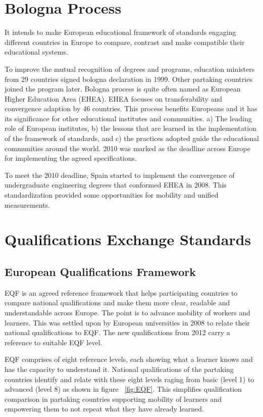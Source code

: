 \documentclass[12pt,a4paper,oneside]{book} %
\begin{document}
\section{Bologna Process}

It intends to make European educational framework of standards engaging different countries in Europe to compare, contrast and make compatible their educational systems. \cite{bologna process}

To improve the mutual recognition of degrees and programs, education ministers from 29 countries signed bologna declaration in 1999. Other partaking countries joined the program later. \cite{improvement bologna process} Bologna process is quite often named as European Higher Education Area (EHEA). EHEA focuses on transferability and convergence adaption by 46 countries. This process benefits Europeans and it has its significance for other educational institutes and communities. a) The leading role of European institutes, b) the lessons that are learned in the implementation of the framework of standards, and c) the practices adopted guide the educational communities around the world. 2010 was marked as the deadline across Europe for implementing the agreed specifications. \cite{European Higher Education Area }

To meet the 2010 deadline, Spain started to implement the convergence of undergraduate engineering degrees that conformed EHEA in 2008. This standardization provided some opportunities for mobility and unified measurements. \cite{European Higher Education Area }




\section{Qualifications Exchange Standards}

    \subsection{European Qualifications Framework}
    EQF is an agreed reference framework that helps participating countries to compare national qualifications and make them more clear, readable and understandable across Europe. The point is to advance mobility of workers and learners. This was settled upon by European universities in 2008 to relate their national qualifications to EQF. The new qualifications from 2012 carry a reference to suitable EQF level.

    EQF comprises of eight reference levels, each showing what a learner knows and has the capacity to understand it. National qualifications of the partaking countries identify and relate with these eight levels raging from basic (level 1) to advanced (level 8) as shown in figure ~\ref{fig:EQF}. This simplifies qualification comparison in partaking countries supporting mobility of learners and empowering them to not repeat what they have already learned.
\end{document}
